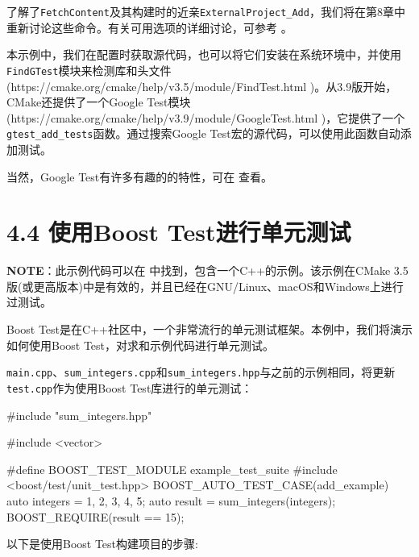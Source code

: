 了解了\texttt{FetchContent}及其构建时的近亲\texttt{ExternalProject\_Add}，我们将在第8章中重新讨论这些命令。有关可用选项的详细讨论，可参考 。

本示例中，我们在配置时获取源代码，也可以将它们安装在系统环境中，并使用\texttt{FindGTest}模块来检测库和头文件(https://cmake.org/cmake/help/v3.5/module/FindTest.html )。从3.9版开始，CMake还提供了一个Google Test模块(https://cmake.org/cmake/help/v3.9/module/GoogleTest.html )，它提供了一个\texttt{gtest\_add\_tests}函数。通过搜索Google Test宏的源代码，可以使用此函数自动添加测试。

当然，Google Test有许多有趣的的特性，可在  查看。


\section{4.4 使用Boost Test进行单元测试}

\begin{myInfoBox}
\textbf{NOTE}：此示例代码可以在  中找到，包含一个C++的示例。该示例在CMake 3.5版(或更高版本)中是有效的，并且已经在GNU/Linux、macOS和Windows上进行过测试。
\end{myInfoBox}

Boost Test是在C++社区中，一个非常流行的单元测试框架。本例中，我们将演示如何使用Boost Test，对求和示例代码进行单元测试。


\texttt{main.cpp}、\texttt{sum\_integers.cpp}和\texttt{sum\_integers.hpp}与之前的示例相同，将更新\texttt{test.cpp}作为使用Boost Test库进行的单元测试：

\begin{codebox}[cpp]
#include "sum_integers.hpp"

#include <vector>

#define BOOST_TEST_MODULE example_test_suite
#include <boost/test/unit_test.hpp>
BOOST_AUTO_TEST_CASE(add_example)
{
  auto integers = {1, 2, 3, 4, 5};
  auto result = sum_integers(integers);
  BOOST_REQUIRE(result == 15);
}
\end{codebox}


以下是使用Boost Test构建项目的步骤:

